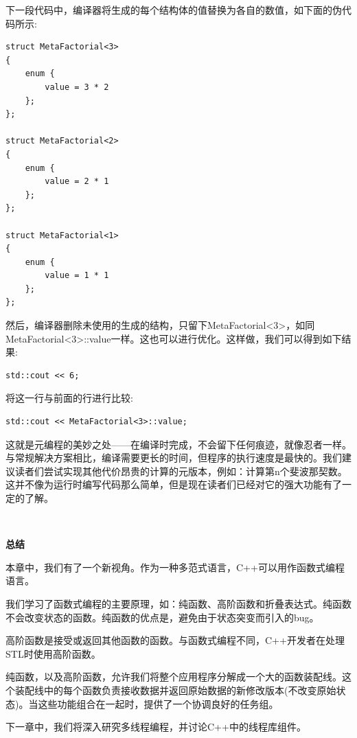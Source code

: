 下一段代码中，编译器将生成的每个结构体的值替换为各自的数值，如下面的伪代码所示: \par

\begin{lstlisting}[caption={}]
struct MetaFactorial<3>
{
	enum {
		value = 3 * 2
	};
};

struct MetaFactorial<2>
{
	enum {
		value = 2 * 1
	};
};

struct MetaFactorial<1>
{
	enum {
		value = 1 * 1
	};
};
\end{lstlisting}

然后，编译器删除未使用的生成的结构，只留下MetaFactorial<3>，如同MetaFactorial<3>::value一样。这也可以进行优化。这样做，我们可以得到如下结果: \par

\begin{lstlisting}[caption={}]
std::cout << 6;
\end{lstlisting}

将这一行与前面的行进行比较: \par

\begin{lstlisting}[caption={}]
std::cout << MetaFactorial<3>::value;
\end{lstlisting}

这就是元编程的美妙之处——在编译时完成，不会留下任何痕迹，就像忍者一样。与常规解决方案相比，编译需要更长的时间，但程序的执行速度是最快的。我们建议读者们尝试实现其他代价昂贵的计算的元版本，例如：计算第n个斐波那契数。这并不像为运行时编写代码那么简单，但是现在读者们已经对它的强大功能有了一定的了解。\par

\noindent\textbf{}\ \par
\textbf{总结} \ \par
本章中，我们有了一个新视角。作为一种多范式语言，C++可以用作函数式编程语言。 \par
我们学习了函数式编程的主要原理，如：纯函数、高阶函数和折叠表达式。纯函数不会改变状态的函数。纯函数的优点是，避免由于状态突变而引入的bug。 \par
高阶函数是接受或返回其他函数的函数。与函数式编程不同，C++开发者在处理STL时使用高阶函数。 \par
纯函数，以及高阶函数，允许我们将整个应用程序分解成一个大的函数装配线。这个装配线中的每个函数负责接收数据并返回原始数据的新修改版本(不改变原始状态)。当这些功能组合在一起时，提供了一个协调良好的任务组。 \par
下一章中，我们将深入研究多线程编程，并讨论C++中的线程库组件。 \par

